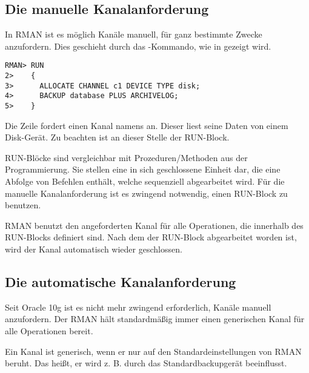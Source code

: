       \subsection{Die manuelle Kanalanforderung}
        In RMAN ist es m\"oglich Kan\"ale manuell, f\"ur ganz bestimmte Zwecke anzufordern. Dies geschieht durch das -Kommando, wie in  gezeigt wird.
        \begin{lstlisting}[caption={Manuelle Kanalanforderung},label=admin1014,language=rman]
RMAN> RUN
2>    {
3>      ALLOCATE CHANNEL c1 DEVICE TYPE disk;
4>      BACKUP database PLUS ARCHIVELOG;
5>    }
        \end{lstlisting}
        Die Zeile  fordert einen Kanal namens  an. Dieser liest seine Daten von einem Disk-Ger\"at. Zu beachten ist an dieser Stelle der RUN-Block.

        \begin{merke}
          RUN-Bl\"ocke sind vergleichbar mit Prozeduren/Methoden aus der Programmierung. Sie stellen eine in sich geschlossene Einheit dar, die eine Abfolge von Befehlen enth\"alt, welche sequenziell abgearbeitet wird. F\"ur die manuelle Kanalanforderung ist es zwingend notwendig, einen RUN-Block zu benutzen.
        \end{merke}

        RMAN benutzt den angeforderten Kanal f\"ur alle Operationen, die innerhalb des RUN-Blocks definiert sind. Nach dem der RUN-Block abgearbeitet worden ist, wird der Kanal automatisch wieder geschlossen.
      \subsection{Die automatische Kanalanforderung}
        Seit Oracle 10g ist es nicht mehr zwingend erforderlich, Kan\"ale manuell anzufordern. Der RMAN h\"alt standardm\"a\ss{}ig immer einen generischen Kanal f\"ur alle Operationen bereit.
        \begin{merke}
          Ein Kanal ist generisch, wenn er nur auf den Standardeinstellungen von RMAN beruht. Das hei\ss{}t, er wird z. B. durch das Standardbackupger\"at beeinflusst.
        \end{merke}
